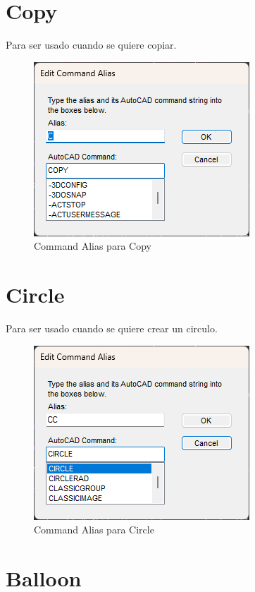 \documentclass[12pt,letterpaper,final]{report}
\begin{document}
\section{Copy}

Para ser usado cuando se quiere copiar.

\begin{figure}[H]
	\centering
	\includegraphics[width=0.55\linewidth, height=0.45\textheight,keepaspectratio]{Imagenes/autocad_alias_copy_01}
	\caption{Command Alias para Copy}
	\label{fig:autocadaliascopy01}
\end{figure}


\section{Circle}

Para ser usado cuando se quiere crear un circulo.

\begin{figure}[H]
	\centering
	\includegraphics[width=0.55\linewidth, height=0.45\textheight,keepaspectratio]{Imagenes/autocad_alias_circle_01}
	\caption{Command Alias para Circle}
	\label{fig:autocadaliascircle01}
\end{figure}

\section{Balloon}
\end{document}

